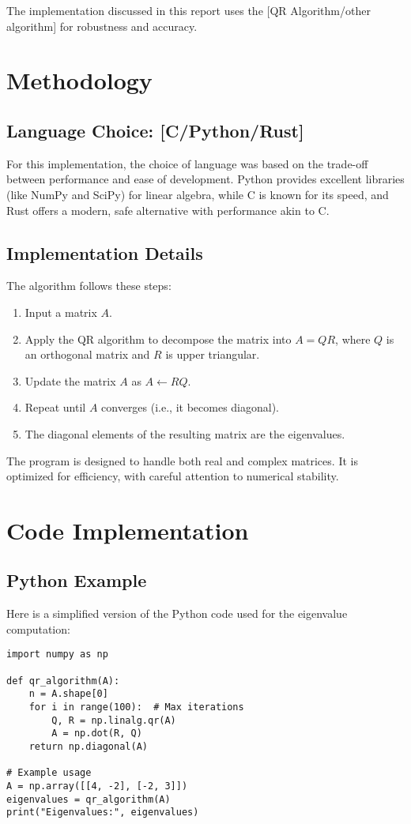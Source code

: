 \documentclass[12pt]{article}
\begin{document}
The implementation discussed in this report uses the [QR Algorithm/other algorithm] for robustness and accuracy.

\section{Methodology}
\subsection{Language Choice: [C/Python/Rust]}
For this implementation, the choice of language was based on the trade-off between performance and ease of development. Python provides excellent libraries (like NumPy and SciPy) for linear algebra, while C is known for its speed, and Rust offers a modern, safe alternative with performance akin to C.

\subsection{Implementation Details}
The algorithm follows these steps:
\begin{enumerate}
    \item Input a matrix \( A \).
    \item Apply the QR algorithm to decompose the matrix into \( A = Q R \), where \( Q \) is an orthogonal matrix and \( R \) is upper triangular.
    \item Update the matrix \( A \) as \( A \gets R Q \).
    \item Repeat until \( A \) converges (i.e., it becomes diagonal).
    \item The diagonal elements of the resulting matrix are the eigenvalues.
\end{enumerate}

The program is designed to handle both real and complex matrices. It is optimized for efficiency, with careful attention to numerical stability.

\section{Code Implementation}
\subsection{Python Example}
Here is a simplified version of the Python code used for the eigenvalue computation:

\begin{verbatim}
import numpy as np

def qr_algorithm(A):
    n = A.shape[0]
    for i in range(100):  # Max iterations
        Q, R = np.linalg.qr(A)
        A = np.dot(R, Q)
    return np.diagonal(A)

# Example usage
A = np.array([[4, -2], [-2, 3]])
eigenvalues = qr_algorithm(A)
print("Eigenvalues:", eigenvalues)
\end{verbatim}
\end{document}
